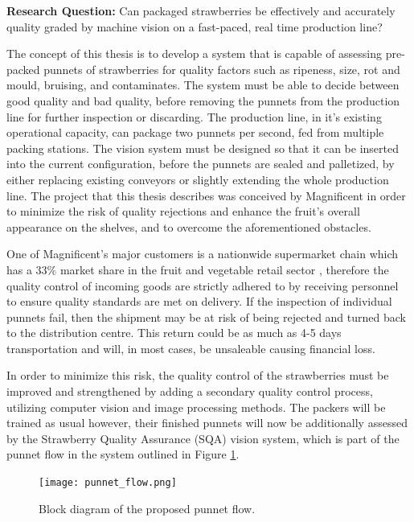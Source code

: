 \documentclass[fleqn,twoside,12pt]{report}
\begin{document}
\textbf{Research Question:} Can packaged strawberries be effectively and accurately quality graded by machine vision on a fast-paced, real time production line?

The concept of this thesis is to develop a system that is capable of assessing pre-packed punnets of strawberries for quality factors such as ripeness, size, rot and mould, bruising, and contaminates. The system must be able to decide between good quality and bad quality, before removing the punnets from the production line for further inspection or discarding. The production line, in it's existing operational capacity, can package two punnets per second, fed from multiple packing stations. The vision system must be designed so that it can be inserted into the current configuration, before the punnets are sealed and palletized, by either replacing existing conveyors or slightly extending the whole production line. The project that this thesis describes was conceived by Magnificent in order to minimize the risk of quality rejections and enhance the fruit's overall appearance on the shelves, and to overcome the aforementioned obstacles.

One of Magnificent's major customers is a nationwide supermarket chain which has a 33\% market share in the fruit and vegetable retail sector \cite{roymorgan}, therefore the quality control of incoming goods are strictly adhered to by receiving personnel to ensure quality standards are met on delivery. If the inspection of individual punnets fail, then the shipment may be at risk of being rejected and turned back to the distribution centre. This return could be as much as 4-5 days transportation and will, in most cases, be unsaleable causing financial loss.

In order to minimize this risk, the quality control of the strawberries must be improved and strengthened by adding a secondary quality control process, utilizing computer vision and image processing methods. The packers will be trained as usual however, their finished punnets will now be additionally assessed by the Strawberry Quality Assurance (SQA) vision system, which is part of the punnet flow in the system outlined in Figure \ref{fig:punnet_flow}. 

\begin{figure}[h]
	\centering
	\texttt{[image: punnet\_flow.png]}
	\caption{Block diagram of the proposed punnet flow.}
	\label{fig:punnet_flow}
\end{figure}
\end{document}
